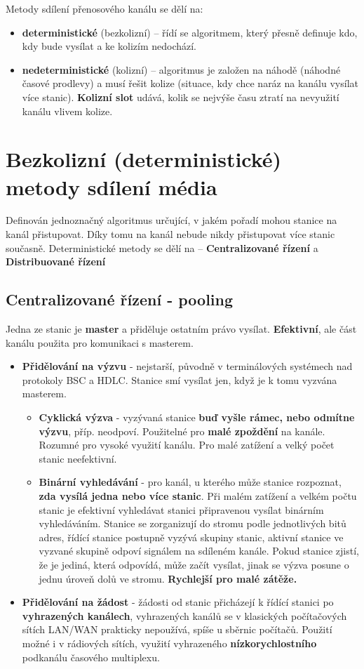Metody sdílení přenosového kanálu se dělí na:
\begin{itemize}
    \item \textbf{deterministické} (bezkolizní) -- řídí se algoritmem, který přesně definuje kdo, kdy bude vysílat a ke kolizím nedochází.
    \item \textbf{nedeterministické} (kolizní) -- algoritmus je založen na náhodě (náhodné časové prodlevy) a musí řešit kolize (situace, kdy chce naráz na kanálu vysílat více stanic). \textbf{Kolizní slot} udává, kolik se nejvýše času ztratí na nevyužití kanálu vlivem kolize.
\end{itemize}

\section{Bezkolizní (deterministické) metody sdílení média}
Definován jednoznačný algoritmus určující, v jakém pořadí mohou stanice na kanál přistupovat. Díky tomu na kanál nebude nikdy přistupovat více stanic současně. Deterministické metody se dělí na -- \textbf{Centralizované řízení} a \textbf{Distribuované řízení}

\subsection{Centralizované řízení - pooling}
Jedna ze stanic je \textbf{master} a přiděluje ostatním právo vysílat. \textbf{Efektivní}, ale část kanálu použita pro komunikaci s masterem.
\begin{itemize}
    \item \textbf{Přidělování na výzvu} - nejstarší, původně v terminálových systémech nad protokoly BSC a HDLC. Stanice smí vysílat jen, když je k tomu vyzvána masterem.
          \begin{itemize}
              \item \textbf{Cyklická výzva} - vyzývaná stanice \textbf{buď vyšle rámec, nebo odmítne výzvu}, příp. neodpoví. Použitelné pro \textbf{malé zpoždění} na kanále. Rozumné pro vysoké využití kanálu. Pro malé zatížení a velký počet stanic neefektivní.
              \item \textbf{Binární vyhledávání} - pro kanál, u kterého může stanice rozpoznat,\textbf{ zda vysílá jedna nebo více stanic}. Při malém zatížení a velkém počtu stanic je efektivní vyhledávat stanici připravenou vysílat binárním vyhledáváním. Stanice se zorganizují do stromu podle jednotlivých bitů adres, řídící stanice postupně vyzývá skupiny stanic, aktivní stanice ve vyzvané skupině odpoví signálem na sdíleném kanále. Pokud stanice zjistí, že je jediná, která odpovídá, může začít vysílat, jinak se výzva posune o jednu úroveň dolů ve stromu. \textbf{Rychlejší pro malé zátěže.}
          \end{itemize}
    \item \textbf{Přidělování na žádost} - žádosti od stanic přicházejí k řídící stanici po \textbf{vyhrazených kanálech}, vyhrazených kanálů se v klasických počítačových sítích LAN/WAN prakticky nepoužívá, spíše u sběrnic počítačů. Použití možné i v rádiových sítích, využití vyhrazeného \textbf{nízkorychlostního} podkanálu časového multiplexu.
\end{itemize}

